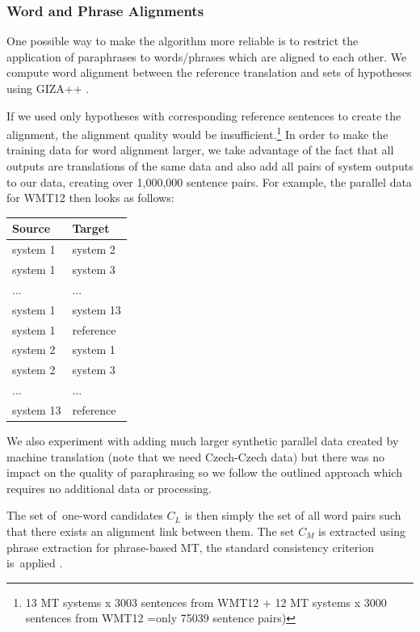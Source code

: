 \subsubsection{Word and Phrase Alignments}

One possible way to make the algorithm more reliable is to restrict the
application of paraphrases to words/phrases which are aligned to each other. 
We compute word alignment between the reference translation and sets of
hypotheses using GIZA++ \citep{gizapp}.

If we used only hypotheses with corresponding reference sentences to create the 
alignment, the alignment quality would be insufficient.\footnote{13 MT systems x 
3003 sentences from WMT12 + 12 MT systems x 3000 sentences from WMT12
=only  75039 sentence pairs)} In order 
to make the training data for word alignment larger, we take advantage of the 
fact that all outputs are translations of the same data and also add all pairs 
of system outputs to our data, creating over 1,000,000  sentence
pairs. For example, the parallel data for WMT12 then looks as follows:

\begin{center}
\begin{tabular}{ll}
Source & Target \\
\hline
system 1 & system 2 \\
system 1 & system 3 \\
... & ...\\
system 1 & system 13 \\
system 1 & reference \\
system 2 & system 1 \\
system 2 & system 3 \\
... & ... \\
system 13 & reference \\
\end{tabular}
\end{center}

We also experiment with adding much larger synthetic parallel data created by
machine translation (note that we need Czech-Czech data) but there was no impact
on the quality of paraphrasing so we follow the outlined approach which requires
no additional data or processing.

The set of~one-word candidates $C_L$ is then simply the set of all word pairs such
that there exists an alignment link between them. The set $C_M$ is extracted
using phrase extraction for phrase-based MT, the standard consistency criterion
is~applied \citep{Och99improvedalignment}.

